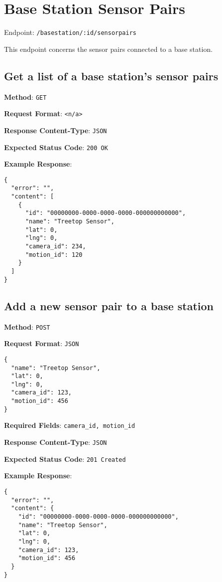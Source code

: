 \section{Base Station Sensor Pairs}

Endpoint: \texttt{/basestation/:id/sensorpairs}

\noindent
This endpoint concerns the sensor pairs connected to a base station.\\


\subsection{Get a list of a base station's sensor pairs}

\noindent
\textbf{Method}: \texttt{GET}

\noindent
\textbf{Request Format}: \texttt{<n/a>}

\noindent
\textbf{Response Content-Type}: \texttt{JSON}

\noindent
\textbf{Expected Status Code}: \texttt{200 OK}

\noindent
\textbf{Example Response}:
\begin{verbatim}
{ 
  "error": "",
  "content": [
    {
      "id": "00000000-0000-0000-0000-000000000000",
      "name": "Treetop Sensor",
      "lat": 0,
      "lng": 0,
      "camera_id": 234,
      "motion_id": 120
    }
  ]
}
\end{verbatim}


\subsection{Add a new sensor pair to a base station}

\noindent
\textbf{Method}: \texttt{POST}

\noindent
\textbf{Request Format}: \texttt{JSON}
\begin{verbatim}
{ 
  "name": "Treetop Sensor",
  "lat": 0,
  "lng": 0,
  "camera_id": 123,
  "motion_id": 456
}
\end{verbatim}

\noindent
\textbf{Required Fields}: \texttt{camera\_id, motion\_id}

\noindent
\textbf{Response Content-Type}: \texttt{JSON}

\noindent
\textbf{Expected Status Code}: \texttt{201 Created}

\noindent
\textbf{Example Response}:
\begin{verbatim}
{ 
  "error": "",
  "content": {
    "id": "00000000-0000-0000-0000-000000000000",
    "name": "Treetop Sensor",
    "lat": 0,
    "lng": 0,
    "camera_id": 123,
    "motion_id": 456
  }
}
\end{verbatim}



